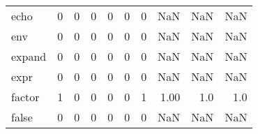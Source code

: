 \begin{longtable}{lrrrrrrrrr}
echo      &                                       0 &                                                  0 &                                                  0 &                                                  0 &                                                  0 &                                                  0 &                                                NaN &                                    NaN &                                  NaN \\
env       &                                       0 &                                                  0 &                                                  0 &                                                  0 &                                                  0 &                                                  0 &                                                NaN &                                    NaN &                                  NaN \\
expand    &                                       0 &                                                  0 &                                                  0 &                                                  0 &                                                  0 &                                                  0 &                                                NaN &                                    NaN &                                  NaN \\
expr      &                                       0 &                                                  0 &                                                  0 &                                                  0 &                                                  0 &                                                  0 &                                                NaN &                                    NaN &                                  NaN \\
factor    &                                       1 &                                                  0 &                                                  0 &                                                  0 &                                                  0 &                                                  1 &                                               1.00 &                                    1.0 &                                  1.0 \\
false     &                                       0 &                                                  0 &                                                  0 &                                                  0 &                                                  0 &                                                  0 &                                                NaN &                                    NaN &                                  NaN \\

\end{longtable}
